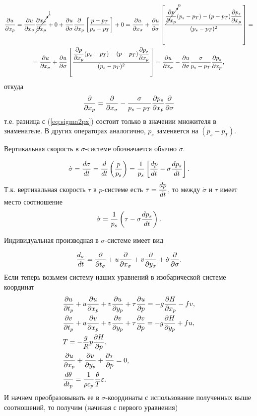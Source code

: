 \begin{multline*}
    \pd{u}{x_p}=
    \pd{u}{x_{\sigma}} \cancelto{1}{\pd{x_{\sigma}}{x_p}} + 0 + \pd{u}{\sigma}\pd{}{x_p} \left[ \frac{p-p_T}{p_s-p_T} \right] + 0 =
    \pd{u}{x_{\sigma}} + 
    \pd{u}{\sigma} 
        \left[ 
            \frac{ \cancelto{0}{ \pd{p}{x_p}}(p_s-p_T) - 
            (p-p_T)\pd{p_s}{x_p} } { (p_s-p_T)^2 }  
        \right] = \\
        = \pd{u}{x_{\sigma}} + 
        \pd{u}{\sigma} 
            \left[  
                \frac{ \pd{p}{x_p}(p_s-p_T) - (p-p_T) \pd{p_s}{x_p} }{ (p_s-p_T)^2 }
            \right] = 
        \pd{u}{x_{\sigma}} - \pd{u}{\sigma}\frac{\sigma}{p_s-p_T}\pd{p_s}{x_p},      
\end{multline*}
откуда
\begin{equation}
    \pd{}{x_p}=\pd{}{x_{\sigma}}-\frac{\sigma}{p_s-p_T}\pd{p_s}{x_p}\pd{}{\sigma}
\end{equation}
т.е. разница с (\ref{eq:sigma2px}) состоит только в значении множителя в знаменателе. В других операторах аналогично, $p_s$ заменяется на $(p_s-p_T)$.
 
Вертикальная скорость в $\sigma$-системе обозначается обычно $\dot{\sigma}$.

\begin{equation}
    \dot{\sigma} = \td{\sigma}{t}=\td{}{t} \left( \frac{p}{p_s} \right) = \frac{1}{p_s} \left[ \td{p}{t} - \sigma\td{p_s}{t} \right]. 
\end{equation}
Т.к. вертикальная скорость  $\tau$ в $p$-системе есть $\tau=\td{p}{t}$, то между $\dot{\sigma}$ и $\tau$ имеет место соотношение
\begin{equation}
    \dot{\sigma}=\frac{1}{p_s} \left( \tau - \sigma\td{p_s}{t} \right).
\end{equation}

Индивидуальная производная в $\sigma$-системе имеет вид 

\begin{equation*}
    \frac{d_{\sigma}}{dt} = \pd{}{t_{\sigma}} + u\pd{}{x_{\sigma}} + v\pd{}{y_{\sigma}} + \dot{\sigma}\pd{}{\sigma}.
\end{equation*}
Если теперь возьмем  систему  наших уравнений в изобарической системе координат 
\begin{align*}
    &\pd{u}{t_p} + u\pd{u}{x_p} + v\pd{u}{y_p} + \tau\pd{u}{p} = -g\pd{H}{x_p} - fv,\\
    &\pd{v}{t_p} + u\pd{v}{x_p} + v\pd{v}{y_p} + \tau\pd{v}{p} = -g\pd{H}{y_p} + fu,\\
    &T = -\frac{g}{R}p\pd{H}{p},\\
    &\pd{u}{x_p} + \pd{v}{y_p} + \pd{\tau}{p} = 0, \\
    &\td{\theta}{t_p} = \frac{1}{\rho c_p} \frac{\theta}{T}\varepsilon.
\end{align*}
И начнем преобразовывать ее в $\sigma$-координаты с использование полученных выше соотношений, то получим (начиная с первого уравнения)

